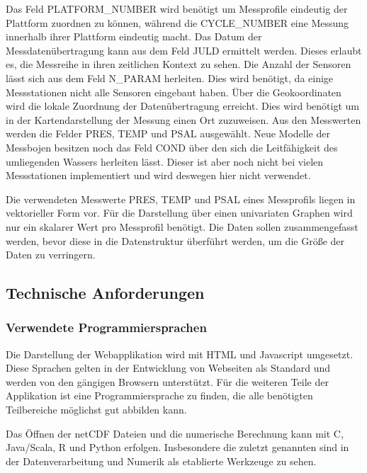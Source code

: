 Das Feld PLATFORM\_NUMBER wird benötigt um Messprofile eindeutig der Plattform zuordnen zu können, während die CYCLE\_NUMBER eine Messung innerhalb ihrer Plattform eindeutig macht. Das Datum der Messdatenübertragung kann aus dem Feld JULD ermittelt werden. Dieses erlaubt es, die Messreihe in ihren zeitlichen Kontext zu sehen. Die Anzahl der Sensoren lässt sich aus dem Feld N\_PARAM herleiten. Dies wird benötigt, da einige Messstationen nicht alle Sensoren eingebaut haben. Über die Geokoordinaten wird die lokale Zuordnung der Datenübertragung erreicht. Dies wird benötigt um in der Kartendarstellung der Messung einen Ort zuzuweisen.
Aus den Messwerten werden die Felder PRES, TEMP und PSAL ausgewählt. Neue Modelle der Messbojen besitzen noch das Feld COND über den sich die Leitfähigkeit des umliegenden Wassers herleiten lässt. Dieser ist aber noch nicht bei vielen Messstationen implementiert und wird deswegen hier nicht verwendet.

Die verwendeten Messwerte PRES, TEMP und PSAL eines Messprofils liegen in vektorieller Form vor. Für die Darstellung über einen univariaten Graphen wird nur ein skalarer Wert pro Messprofil benötigt. Die Daten sollen zusammengefasst werden, bevor diese in die Datenstruktur überführt werden, um die Größe der Daten zu verringern.


\subsection{Technische Anforderungen  }

\subsubsection{Verwendete Programmiersprachen}

Die Darstellung der Webapplikation wird mit \gls{HTML} und Javascript umgesetzt. Diese Sprachen gelten in der Entwicklung von Webseiten als Standard und werden von den gängigen Browsern unterstützt.
Für die weiteren Teile der Applikation ist eine Programmiersprache zu finden, die alle benötigten Teilbereiche möglichst gut abbilden kann.

Das Öffnen der \gls{netCDF} Dateien und die numerische Berechnung kann mit C, Java/Scala, R und Python erfolgen. Insbesondere die zuletzt genannten sind in der Datenverarbeitung und Numerik als etablierte Werkzeuge zu sehen.

